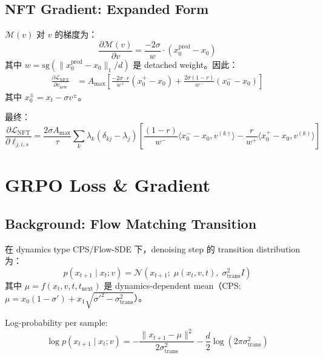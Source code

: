 \documentclass[11pt,a4paper]{article}
\newcommand{\loss}{\mathcal{L}}
\newcommand{\N}{\mathcal{N}}
\newcommand{\sg}{\mathrm{sg}}
\theoremstyle{definition}
\begin{document}
\subsection{NFT Gradient: Expanded Form}

$\mathcal{M}(v)$ 对 $v$ 的梯度为：
\begin{equation}
\frac{\partial \mathcal{M}(v)}{\partial v} = \frac{-2\sigma}{w} \cdot (x_0^{\mathrm{pred}} - x_0)
\end{equation}
其中 $w = \sg(\|x_0^{\mathrm{pred}} - x_0\|_1/d)$ 是 detached weight。因此：
\begin{align}
\frac{\partial \loss_{\mathrm{NFT}}}{\partial v_{\mathrm{new}}} &= A_{\max}\left[\frac{-2\sigma \cdot r}{w^+}(x_0^{+} - x_0) + \frac{2\sigma(1-r)}{w^-}(x_0^{-} - x_0)\right]
\end{align}
其中 $x_0^{\pm} = x_t - \sigma v^{\pm}$。

最终：
\begin{equation}
\frac{\partial \loss_{\mathrm{NFT}}}{\partial \ell_{j,i,s}} = \frac{2\sigma A_{\max}}{\tau} \sum_k \lambda_k(\delta_{kj}-\lambda_j)\left[\frac{(1-r)}{w^-}\langle x_0^{-}-x_0, v^{(k)}\rangle - \frac{r}{w^+}\langle x_0^{+}-x_0, v^{(k)}\rangle\right]
\label{eq:nft_full_gradient}
\end{equation}

\section{GRPO Loss \& Gradient}
\label{sec:grpo}

\subsection{Background: Flow Matching Transition}

在 dynamics type CPS/Flow-SDE 下，denoising step 的 transition distribution 为：
\begin{equation}
p(x_{t+1} \mid x_t; v) = \N\!\left(x_{t+1};\; \mu(x_t, v, t),\; \sigma_{\mathrm{trans}}^2 I\right)
\end{equation}
其中 $\mu = f(x_t, v, t, t_{\mathrm{next}})$ 是 dynamics-dependent mean（CPS: $\mu = x_0(1-\sigma') + x_1\sqrt{\sigma'^2 - \sigma_{\mathrm{trans}}^2}$）。

Log-probability per sample:
\begin{equation}
\log p(x_{t+1} \mid x_t; v) = -\frac{\|x_{t+1} - \mu\|^2}{2\sigma_{\mathrm{trans}}^2} - \frac{d}{2}\log(2\pi\sigma_{\mathrm{trans}}^2)
\label{eq:log_prob}
\end{equation}
\end{document}
